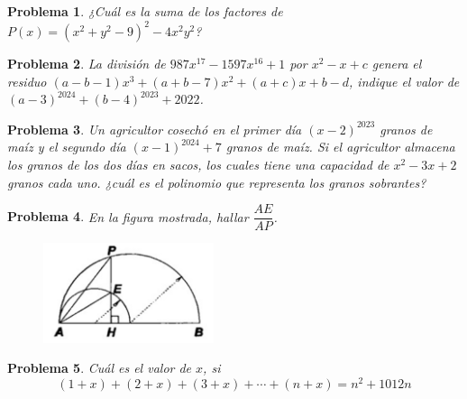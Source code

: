 \documentclass[12pt]{beamer}
\newtheorem{section-problem}{Problema}
\begin{document}
   \begin{frame}
      \begin{section-problem}
         ¿Cuál es la suma de los factores de $P(x) = (x^2 + y^2 - 9)^2 - 4x^2 y^2$?
      \end{section-problem}
   \end{frame}

   \begin{frame}
      \begin{section-problem}
         La división de $987x^{17} - 1597x^{16} + 1$ por $x^2 - x + c$ genera el residuo $(a - b - 1)x^3 + (a + b - 7)x^2 + (a + c)x + b - d$, indique el valor de $(a - 3)^{2024} + (b - 4)^{2023} + 2022$.
      \end{section-problem}
   \end{frame}

   \begin{frame}
      \begin{section-problem}
         Un agricultor cosechó en el primer día $(x - 2)^{2023}$ granos de maíz y el segundo día $(x - 1)^{2024} + 7$ granos de maíz.
         Si el agricultor almacena los granos de los dos días en sacos, los cuales tiene una capacidad de $x^2 - 3x + 2$ granos cada uno.
         ¿cuál es el polinomio que representa los granos sobrantes?
      \end{section-problem}
   \end{frame}

   \begin{frame}
      \begin{section-problem}
         En la figura mostrada, hallar $\dfrac{AE}{AP}$.
         \begin{figure}[htb]
            \centering
            \includegraphics[width=5cm]{image3.geo}
         \end{figure}
      \end{section-problem}
   \end{frame}

   \begin{frame}
      \begin{section-problem}
         Cuál es el valor de $x$, si
         \[(1 + x) + (2 + x) + (3 + x) + \cdots + (n + x) = n^2 + 1012n\]
      \end{section-problem}
   \end{frame}
\end{document}
